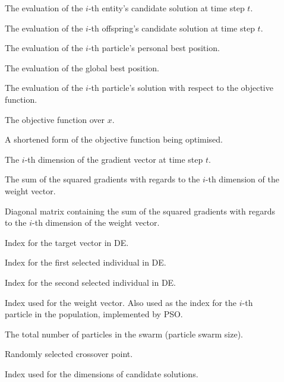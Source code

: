 \begin{description}
	\item [\parbox{2cm}{$f(\boldsymbol{x}_{i}(t))$}] \parbox{12.5cm}{The evaluation of the $i$-th entity's candidate solution at time step $t$.}
	\item [\parbox{2cm}{$f(\boldsymbol{x}'_{i}(t))$}] \parbox{12.5cm}{The evaluation of the $i$-th offspring's candidate solution at time step $t$.}
	\item [\parbox{2cm}{$f(\boldsymbol{y}_{i})$}] \parbox{12.5cm}{The evaluation of the $i$-th particle's personal best position.}
	\item [\parbox{2cm}{$f(\hat{y})$}] \parbox{12.5cm}{The evaluation of the global best position.}
	\item [\parbox{2cm}{$f(x_{i})$}] \parbox{12.5cm}{The evaluation of the $i$-th particle's solution with respect to the objective function.}
	\item [\parbox{2cm}{$f(x)$}] \parbox{12.5cm}{The objective function over $x$.}
	\item [\parbox{2cm}{$f$}] \parbox{12.5cm}{A shortened form of the objective function being optimised.}
	\item [\parbox{2cm}{$g_{t,i}$}] \parbox{12.5cm}{The $i$-th dimension of the gradient vector at time step $t$.}
	\item [\parbox{2cm}{$G_{t,i}$}] \parbox{12.5cm}{The sum of the squared gradients with regards to the $i$-th dimension of the weight vector.}
	\item [\parbox{2cm}{$G_{t,ii}$}] \parbox{12.5cm}{Diagonal matrix containing the sum of the squared gradients with regards to the $i$-th dimension of the weight vector.}
	\item [\parbox{2cm}{$i_{1}$}] \parbox{12.5cm}{Index for the target vector in \acs{DE}.}
	\item [\parbox{2cm}{$i_{2}$}] \parbox{12.5cm}{Index for the first selected individual in \acs{DE}.}
	\item [\parbox{2cm}{$i_{3}$}] \parbox{12.5cm}{Index for the second selected individual in \acs{DE}.}
	\item [\parbox{2cm}{$i$}] \parbox{12.5cm}{Index used for the weight vector. Also used as the index for the $i$-th particle in the population, implemented by \acs{PSO}.}
	\item [\parbox{2cm}{$I$}] \parbox{12.5cm}{The total number of particles in the swarm (particle swarm size).}
	\item [\parbox{2cm}{$j^{*}$}] \parbox{12.5cm}{Randomly selected crossover point.}
	\item [\parbox{2cm}{$j$}] \parbox{12.5cm}{Index used for the dimensions of candidate solutions.}

\end{description}
